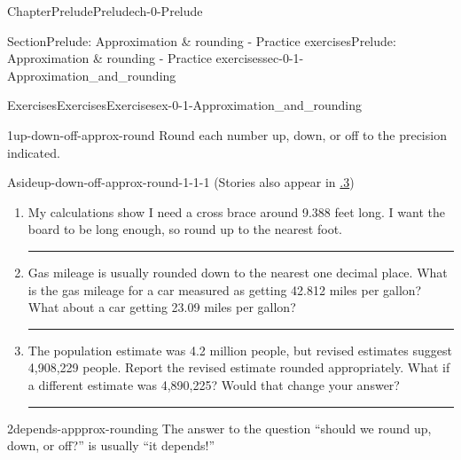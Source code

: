 \documentclass[twoside,11pt,]{book}
\newcommand{\xreffont}{\relax}
\newlength{\workspacestrutwidth}
\numberwithin{equation}{section}
\begin{document}
\begin{chapterptx}{Chapter}{Prelude}{}{Prelude}{}{}{ch-0-Prelude}
\renewcommand*{\chaptername}{Chapter}
%
%
\typeout{************************************************}
\typeout{************************************************}
%
\begin{sectionptx}{Section}{Prelude: Approximation \& rounding - Practice exercises}{}{Prelude: Approximation \& rounding - Practice exercises}{}{}{sec-0-1-Approximation_and_rounding}
%
%
\typeout{************************************************}
\typeout{************************************************}
%
\begin{exercises-subsection-numberless}{Exercises}{Exercises}{}{Exercises}{}{}{ex-0-1-Approximation_and_rounding}
\begin{divisionexercise}{1}{}{}{up-down-off-approx-round}%
Round each number up, down, or off to the precision indicated. \begin{aside}{Aside}{}{up-down-off-approx-round-1-1-1}%
(Stories also appear in \hyperlink{rounding-variables-functions}{{\xreffont 1.1.3}})%
\end{aside}
%
\begin{enumerate}[label=(\alph*),ref=\alph*]%
\item{}My calculations show I need a cross brace around 9.388 feet long. I want the board to be long enough, so round up to the nearest foot.%
\par\rule{\workspacestrutwidth}{1.75in}%
\item{}Gas mileage is usually rounded down to the nearest one decimal place. What is the gas mileage for a car measured as getting 42.812 miles per gallon? What about a car getting 23.09 miles per gallon?%
\par\rule{\workspacestrutwidth}{1.75in}%
\item{}The population estimate was 4.2 million people, but revised estimates suggest 4,908,229 people. Report the revised estimate rounded appropriately. What if a different estimate was 4,890,225? Would that change your answer?%
\par\rule{\workspacestrutwidth}{1.75in}%
\end{enumerate}%
\end{divisionexercise}%
\clearpage
\begin{divisionexercise}{2}{}{}{depends-appprox-rounding}%
The answer to the question ``should we round up, down, or off?'' is usually ``it depends!''%

\end{divisionexercise}
\end{exercises-subsection-numberless}
\end{sectionptx}
\end{chapterptx}
\end{document}
